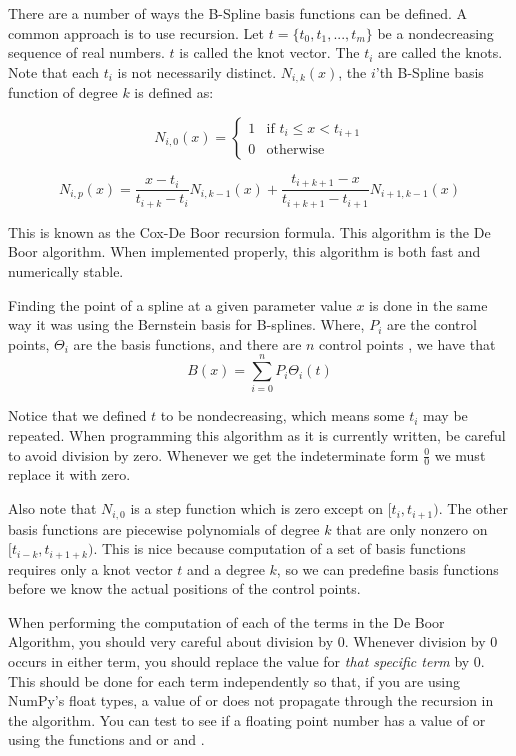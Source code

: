 There are a number of ways the B-Spline basis functions can be defined.
A common approach is to use recursion.
Let $t = \lbrace t_0, t_1, ... , t_m \rbrace$ be a nondecreasing sequence of real numbers.
$t$ is called the knot vector.
The $t_i$ are called the knots.
Note that each $t_i$ is not necessarily distinct.
$N_{i,k}(x)$, the $i$'th B-Spline basis function of degree $k$ is defined as:

\begin{equation}
N_{i,0}(x) =
\begin{cases}
1 & \text{if } t_i \leq x < t_{i+1} \\
0 & \text{otherwise}
\end{cases}
\end{equation}

\begin{equation}
N_{i,p}(x) = \frac{x - t_i}{t_{i+k} - t_i} N_{i,k-1}(x) + \frac{t_{i + k + 1} - x}{t_{i + k + 1} - t_{i + 1}} N_{i+1,k-1}(x)
\end{equation}

This is known as the Cox-De Boor recursion formula.
This algorithm is the De Boor algorithm.
When implemented properly, this algorithm is both fast and numerically stable.

Finding the point of a spline at a given parameter value $x$ is done in the same way it was using the Bernstein basis for B-splines.
Where, $P_i$ are the control points, $\Theta_i$ are the basis functions, and there are $n$ control points , we have that
\[B\left(x\right) = \sum_{i=0}^n P_i \Theta_i\left(t\right)\]

Notice that we defined $t$ to be nondecreasing, which means some $t_i$ may be repeated.
When programming this algorithm as it is currently written, be careful to avoid division by zero.
Whenever we get the indeterminate form $\frac{0}{0}$ we must replace it with zero.

Also note that $N_{i,0}$ is a step function which is zero except on $[t_i, t_{i+1})$.
The other basis functions are piecewise polynomials of degree $k$ that are only nonzero on $[t_{i-k}, t_{i+1+k})$.
This is nice because computation of a set of basis functions requires only a knot vector $t$ and a degree $k$, so we can predefine basis functions before we know the actual positions of the control points.

\begin{warn}
When performing the computation of each of the terms in the De Boor Algorithm, you should very careful about division by $0$.
Whenever division by $0$ occurs in either term, you should replace the value for \emph{that specific term} by $0$.
This should be done for each term independently so that, if you are using NumPy's float types, a value of  or  does not propagate through the recursion in the algorithm.
You can test to see if a floating point number has a value of  or  using the functions  and  or  and .
\end{warn}

